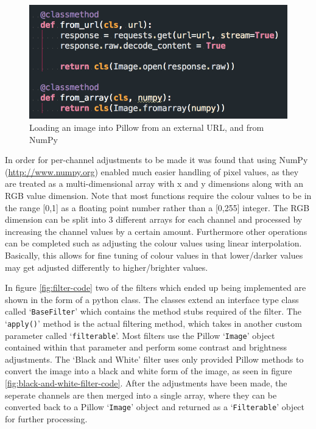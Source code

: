 \documentclass[a4paper,12pt]{report}
\begin{document}
      \begin{figure}[h]
        \centering
        \includegraphics[width=0.5\linewidth]{image-loading}
        \caption{Loading an image into Pillow from an external URL, and from NumPy}
        \label{fig:image-loading}
      \end{figure}

      In order for per-channel adjustments to be made it was found that using NumPy (\url{http://www.numpy.org}) enabled much easier handling of pixel values, as they are treated as a multi-dimensional array with x and y dimensions along with an RGB value dimension. Note that most functions require the colour values to be in the range [0,1] as a floating point number rather than a [0,255] integer. The RGB dimension can be split into 3 different arrays for each channel and processed by increasing the channel values by a certain amount. Furthermore other operations can be completed such as adjusting the colour values using linear interpolation. Basically, this allows for fine tuning of colour values in that lower/darker values may get adjusted differently to higher/brighter values.

      In figure \ref{fig:filter-code} two of the filters which ended up being implemented are shown in the form of a python class. The classes extend an interface type class called ‘\texttt{BaseFilter}’ which contains the method stubs required of the filter. The ‘\texttt{apply()}’ method is the actual filtering method, which takes in another custom parameter called ‘\texttt{filterable}’. Most filters use the Pillow ‘\texttt{Image}’ object contained within that parameter and perform some contrast and brightness adjustments. The ‘Black and White’ filter uses only provided Pillow methods to convert the image into a black and white form of the image, as seen in figure \ref{fig:black-and-white-filter-code}. After the adjustments have been made, the seperate channels are then merged into a single array, where they can be converted back to a Pillow ‘\texttt{Image}’ object and returned as a ‘\texttt{Filterable}’ object for further processing.
\end{document}
